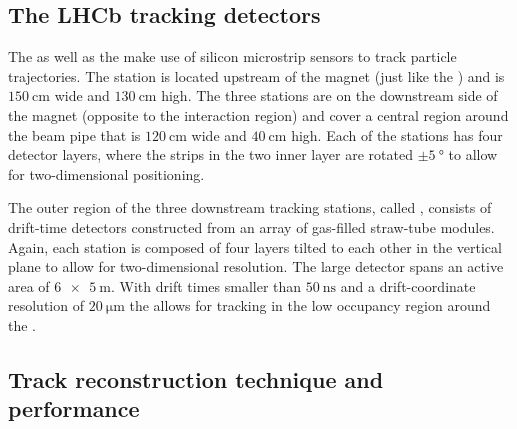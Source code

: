 \subsection{The \acs*{LHCb} tracking detectors}
\label{sec:lhcb_experiment:tracking:ttit}
\label{sec:lhcb_experiment:tracking:ot}

The \TT as well as the \IT make use of silicon microstrip sensors to track
particle trajectories. The \TT station is located upstream of the magnet (just
like the \VELO) and is $\SI{150}{\centi\metre}$ wide and
$\SI{130}{\centi\metre}$ high. The three \IT stations are on the downstream side
of the magnet (opposite to the interaction region) and cover a central region
around the beam pipe that is $\SI{120}{\centi\metre}$ wide and
$\SI{40}{\centi\metre}$ high. Each of the stations has four detector layers,
where the strips in the two inner layer are rotated $\pm\SI{5}{\degree}$ to
allow for two-dimensional positioning.

The outer region of the three downstream tracking stations, called \OT, consists
of drift-time detectors constructed from an array of gas-filled straw-tube
modules. Again, each station is composed of four layers tilted to each other in
the vertical plane to allow for two-dimensional resolution. The large detector
spans an active area of $\SI[product-units = power]{6 x 5}{\metre}$. With drift
times smaller than $\SI{50}{\nano\second}$ and a drift-coordinate resolution of
$\SI{20}{\micro\metre}$ the \OT allows for tracking in the low occupancy region
around the \IT.

\subsection{Track reconstruction technique and performance}
\label{sec:lhcb_experiment:tracking:techniques_and_performance}

